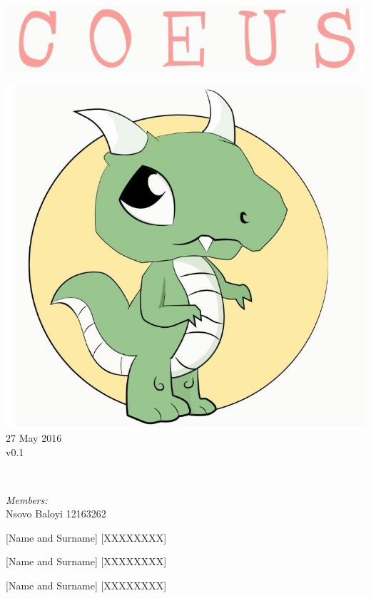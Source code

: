 \documentclass[a4paper,12pt, margin=1.5in]{article}
\begin{document}
\begin{titlepage}
	\includegraphics[width=\textwidth]{name} \\[1cm]
	\begin{minipage}{0.4\textwidth}
	\begin{flushleft} \large
	\includegraphics[width=\textwidth]{logo} \\[0.5cm]
	{\large 27 May 2016}\\
	{\large v0.1}
	\end{flushleft}
	\end{minipage}
	~
	\begin{minipage}{0.5\textwidth}
	\begin{flushright} \large
	\emph{Members:}\\%
	Nsovo Baloyi 12163262

	[Name and Surname] [XXXXXXXX]
	
	[Name and Surname] [XXXXXXXX]
	
	[Name and Surname] [XXXXXXXX]

	\end{flushright}
	\end{minipage}\\[4cm]
\end{titlepage}
\end{document}
